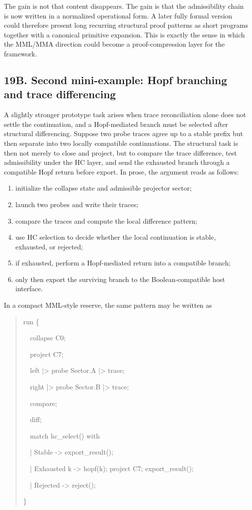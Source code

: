 The gain is not that content disappears. The gain is that the admissibility chain is now written in a normalized operational form. A later fully formal version could therefore present long recurring structural proof patterns as short programs together with a canonical primitive expansion. This is exactly the sense in which the MML/MMA direction could become a proof-compression layer for the framework.


\subsection*{19B. Second mini-example: Hopf branching and trace differencing}
A slightly stronger prototype task arises when trace reconciliation alone does not settle the continuation, and a Hopf-mediated branch must be selected after structural differencing. Suppose two probe traces agree up to a stable prefix but then separate into two locally compatible continuations. The structural task is then not merely to close and project, but to compare the trace difference, test admissibility under the HC layer, and send the exhausted branch through a compatible Hopf return before export. In prose, the argument reads as follows:
\begin{enumerate}[leftmargin=2em]
  \item initialize the collapse state and admissible projector sector;
  \item launch two probes and write their traces;
  \item compare the traces and compute the local difference pattern;
  \item use HC selection to decide whether the local continuation is stable, exhausted, or rejected;
  \item if exhausted, perform a Hopf-mediated return into a compatible branch;
  \item only then export the surviving branch to the Boolean-compatible host interface.
\end{enumerate}
In a compact MML-style reserve, the same pattern may be written as
\begin{quote}
\ttfamily
run \{\par
\ \ collapse C0;\par
\ \ project C7;\par
\ \ left  |> probe Sector.A |> trace;\par
\ \ right |> probe Sector.B |> trace;\par
\ \ compare;\par
\ \ diff;\par
\ \ match hc\_select() with\par
\ \ | Stable      -> export\_result();\par
\ \ | Exhausted k -> hopf(k); project C7; export\_result();\par
\ \ | Rejected    -> reject();\par
\}\par
\end{quote}
